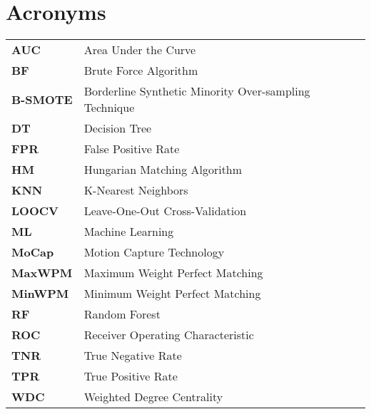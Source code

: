 \section*{\Huge Acronyms}

\begin{table}[H]
    \begin{tabular}{l l} 
        \textbf{AUC} & Area Under the Curve \\
        \textbf{BF} & Brute Force Algorithm \\
        \textbf{B-SMOTE} & Borderline Synthetic Minority Over-sampling Technique \\
        \textbf{DT} & Decision Tree \\
        \textbf{FPR} & False Positive Rate \\
        \textbf{HM} & Hungarian Matching Algorithm \\
        \textbf{KNN} & K-Nearest Neighbors \\
        \textbf{LOOCV} & Leave-One-Out Cross-Validation \\
        \textbf{ML} & Machine Learning \\
        \textbf{MoCap} & Motion Capture Technology \\
        \textbf{MaxWPM} & Maximum Weight Perfect Matching \\
        \textbf{MinWPM} & Minimum Weight Perfect Matching \\
        \textbf{RF} & Random Forest \\
        \textbf{ROC} & Receiver Operating Characteristic \\
        \textbf{TNR} & True Negative Rate \\
        \textbf{TPR} & True Positive Rate \\
        \textbf{WDC} & Weighted Degree Centrality \\
    \end{tabular}
\end{table}

